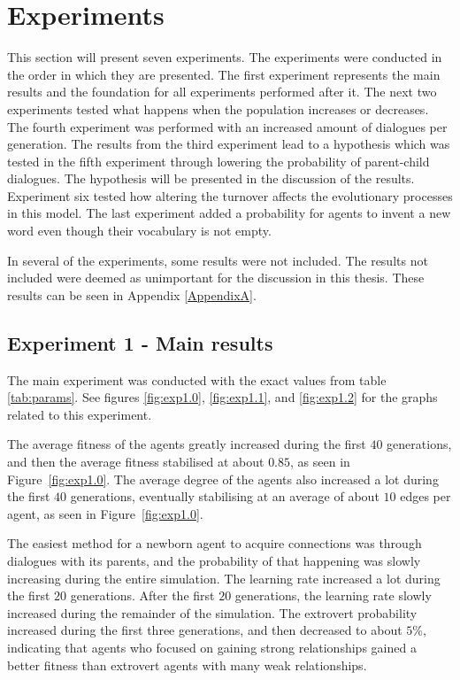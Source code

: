 \section{Experiments}
This section will present seven experiments. The experiments were conducted in the order in which they are presented. The first experiment represents the main results and the foundation for all experiments performed after it. The next two experiments tested what happens when the population increases or decreases. The fourth experiment was performed with an increased amount of dialogues per generation. The results from the third experiment lead to a hypothesis which was tested in the fifth experiment through lowering the probability of parent-child dialogues. The hypothesis will be presented in the discussion of the results. Experiment six tested how altering the turnover affects the evolutionary processes in this model. The last experiment added a probability for agents to invent a new word even though their vocabulary is not empty.

In several of the experiments, some results were not included. The results not included were deemed as unimportant for the discussion in this thesis. These results can be seen in Appendix \ref{AppendixA}.

\subsection{Experiment 1 - Main results}
The main experiment was conducted with the exact values from table \ref{tab:params}. See figures \ref{fig:exp1.0}, \ref{fig:exp1.1}, and \ref{fig:exp1.2} for the graphs related to this experiment.

The average fitness of the agents greatly increased during the first $40$ generations, and then the average fitness stabilised at about $0.85$, as seen in Figure~\ref{fig:exp1.0}. The average degree of the agents also increased a lot during the first $40$ generations, eventually stabilising at an average of about $10$ edges per agent, as seen in Figure~\ref{fig:exp1.0}. 

The easiest method for a newborn agent to acquire connections was through dialogues with its parents, and the probability of that happening was slowly increasing during the entire simulation. The learning rate increased a lot during the first $20$ generations. After the first $20$ generations, the learning rate slowly increased during the remainder of the simulation. The extrovert probability increased during the first three generations, and then decreased to about $5\%$, indicating that agents who focused on gaining strong relationships gained a better fitness than extrovert agents with many weak relationships. 

